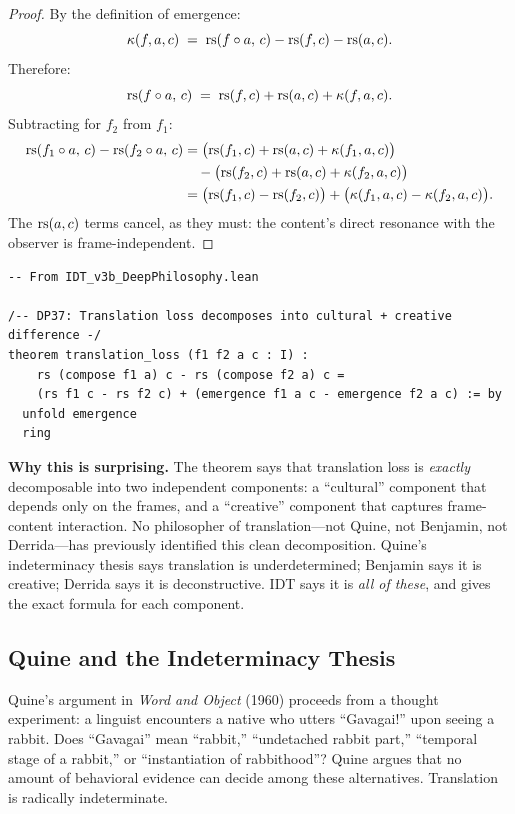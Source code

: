 \begin{proof}
By the definition of emergence:
\[
\kappa(f, a, c) \;=\; \mathrm{rs}(f \circ a,\, c) - \mathrm{rs}(f, c) - \mathrm{rs}(a, c).
\]
Therefore:
\[
\mathrm{rs}(f \circ a,\, c) \;=\; \mathrm{rs}(f, c) + \mathrm{rs}(a, c) + \kappa(f, a, c).
\]
Subtracting for $f_2$ from $f_1$:
\begin{align*}
\mathrm{rs}(f_1 \circ a,\, c) - \mathrm{rs}(f_2 \circ a,\, c)
&= \bigl(\mathrm{rs}(f_1, c) + \mathrm{rs}(a, c) + \kappa(f_1, a, c)\bigr) \\
&\quad- \bigl(\mathrm{rs}(f_2, c) + \mathrm{rs}(a, c) + \kappa(f_2, a, c)\bigr) \\
&= \bigl(\mathrm{rs}(f_1, c) - \mathrm{rs}(f_2, c)\bigr)
   + \bigl(\kappa(f_1, a, c) - \kappa(f_2, a, c)\bigr).
\end{align*}
The $\mathrm{rs}(a, c)$ terms cancel, as they must: the content's direct resonance
with the observer is frame-independent.
\end{proof}

\begin{lstlisting}
-- From IDT_v3b_DeepPhilosophy.lean

/-- DP37: Translation loss decomposes into cultural + creative difference -/
theorem translation_loss (f1 f2 a c : I) :
    rs (compose f1 a) c - rs (compose f2 a) c =
    (rs f1 c - rs f2 c) + (emergence f1 a c - emergence f2 a c) := by
  unfold emergence
  ring
\end{lstlisting}

\begin{surprisebox}
\noindent\textbf{Why this is surprising.}
The theorem says that translation loss is \emph{exactly} decomposable into two
independent components: a ``cultural'' component that depends only on the frames,
and a ``creative'' component that captures frame-content interaction.  No
philosopher of translation---not Quine, not Benjamin, not Derrida---has
previously identified this clean decomposition.  Quine's indeterminacy thesis
says translation is underdetermined; Benjamin says it is creative; Derrida says
it is deconstructive.  IDT says it is \emph{all of these}, and gives the exact
formula for each component.
\end{surprisebox}

\subsection{Quine and the Indeterminacy Thesis}

Quine's argument in \textit{Word and Object} (1960) proceeds from a thought
experiment: a linguist encounters a native who utters ``Gavagai!'' upon seeing
a rabbit.  Does ``Gavagai'' mean ``rabbit,'' ``undetached rabbit part,''
``temporal stage of a rabbit,'' or ``instantiation of rabbithood''?  Quine
argues that no amount of behavioral evidence can decide among these alternatives.
Translation is radically indeterminate.

